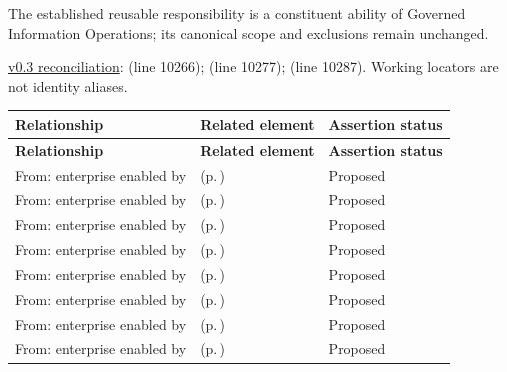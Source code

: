 
The established reusable responsibility is a constituent ability of Governed Information Operations; its canonical scope and exclusions remain unchanged.


\hyperref[model:reconciliation]{v0.3 reconciliation}: \texttt{} (line 10266); \texttt{} (line 10277); \texttt{} (line 10287). Working locators are not identity aliases.
\begingroup\small\setlength{\TableWidth}{\dimexpr\linewidth-6\tabcolsep-4\arrayrulewidth\relax}
\begin{longtable}{|>{\raggedright\arraybackslash}p{0.27\TableWidth}|>{\raggedright\arraybackslash}p{0.48\TableWidth}|>{\raggedright\arraybackslash}p{0.25\TableWidth}|}
\hline\rowcolor{TableHead}\textbf{Relationship} & \textbf{Related element} & \textbf{Assertion status}\\\hline\endfirsthead
\hline\rowcolor{TableHead}\textbf{Relationship} & \textbf{Related element} & \textbf{Assertion status}\\\hline\endhead
\hline\endfoot
From: enterprise enabled by & \nameref{cap:bec-client-privacy} (p.\,\pageref{cap:bec-client-privacy}) & Proposed\\\hline
From: enterprise enabled by & \nameref{cap:bec-health-information-control} (p.\,\pageref{cap:bec-health-information-control}) & Proposed\\\hline
From: enterprise enabled by & \nameref{cap:bec-referral-administration} (p.\,\pageref{cap:bec-referral-administration}) & Proposed\\\hline
From: enterprise enabled by & \nameref{cap:bec-order-administration} (p.\,\pageref{cap:bec-order-administration}) & Proposed\\\hline
From: enterprise enabled by & \nameref{cap:bec-diagnostic-administration} (p.\,\pageref{cap:bec-diagnostic-administration}) & Proposed\\\hline
From: enterprise enabled by & \nameref{cap:bec-medication-administration} (p.\,\pageref{cap:bec-medication-administration}) & Proposed\\\hline
From: enterprise enabled by & \nameref{cap:bec-procedure-administration} (p.\,\pageref{cap:bec-procedure-administration}) & Proposed\\\hline
From: enterprise enabled by & \nameref{cap:bec-episode-encounter-administration} (p.\,\pageref{cap:bec-episode-encounter-administration}) & Proposed\\\hline

\end{longtable}
